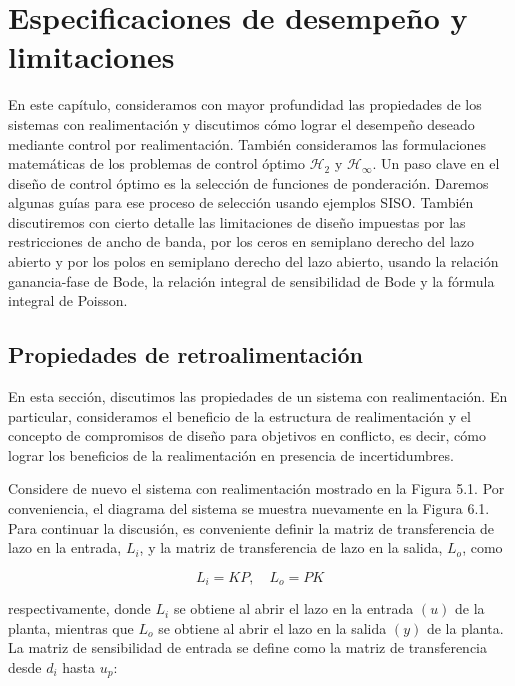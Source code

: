 \chapter{Especificaciones de desempeño y limitaciones}
En este capítulo, consideramos con mayor profundidad las propiedades de los sistemas con realimentación y discutimos cómo lograr el desempeño deseado mediante control por realimentación. También consideramos las formulaciones matemáticas de los problemas de control óptimo $\mathcal{H}_{2}$ y $\mathcal{H}_{\infty}$. Un paso clave en el diseño de control óptimo es la selección de funciones de ponderación. Daremos algunas guías para ese proceso de selección usando ejemplos SISO. También discutiremos con cierto detalle las limitaciones de diseño impuestas por las restricciones de ancho de banda, por los ceros en semiplano derecho del lazo abierto y por los polos en semiplano derecho del lazo abierto, usando la relación ganancia-fase de Bode, la relación integral de sensibilidad de Bode y la fórmula integral de Poisson.

\section{Propiedades de retroalimentación}
En esta sección, discutimos las propiedades de un sistema con realimentación. En particular, consideramos el beneficio de la estructura de realimentación y el concepto de compromisos de diseño para objetivos en conflicto, es decir, cómo lograr los beneficios de la realimentación en presencia de incertidumbres.


Considere de nuevo el sistema con realimentación mostrado en la Figura 5.1. Por conveniencia, el diagrama del sistema se muestra nuevamente en la Figura 6.1. Para continuar la discusión, es conveniente definir la matriz de transferencia de lazo en la entrada, $L_{i}$, y la matriz de transferencia de lazo en la salida, $L_{o}$, como

$$
L_{i}=K P, \quad L_{o}=P K
$$

respectivamente, donde $L_{i}$ se obtiene al abrir el lazo en la entrada $(u)$ de la planta, mientras que $L_{o}$ se obtiene al abrir el lazo en la salida $(y)$ de la planta. La matriz de sensibilidad de entrada se define como la matriz de transferencia desde $d_{i}$ hasta $u_{p}$:

